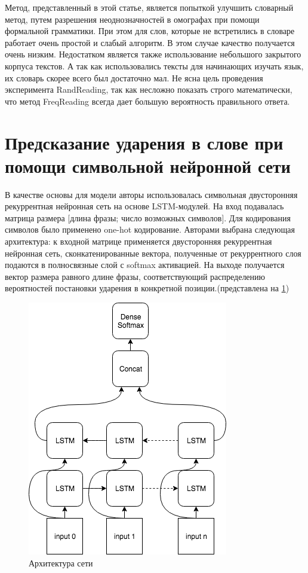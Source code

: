 \documentclass[14pt, a4paper, russian]{report}
\begin{document}
\begin{normalsize}
Метод, представленный в этой статье, является попыткой улучшить словарный метод, путем разрешения неоднозначностей в омографах при помощи формальной грамматики. При этом для слов, которые не  встретились в словаре работает очень простой и слабый алгоритм. В этом случае качество получается очень низким. Недостатком является также использование небольшого закрытого корпуса текстов. А так как использовались тексты для начинающих изучать язык, их словарь скорее всего был достаточно мал. Не ясна цель проведения эксперимента RandReading, так как несложно показать строго математически, что метод FreqReading всегда дает большую вероятность правильного ответа.

\section{Предсказание ударения в слове при помощи символьной нейронной сети}
	В качестве основы для модели авторы \cite{ponomareva} использовалась  символьная двусторонняя рекуррентная нейронная сеть на основе LSTM-модулей. На вход подавалась матрица размера [длина фразы; число возможных символов]. Для кодирования символов было применено one-hot кодирование. Авторами выбрана следующая архитектура: к входной матрице применяется двусторонняя рекуррентная нейронная сеть, сконкатенированные вектора, полученные от рекуррентного слоя подаются в полносвязные слой с softmax активацией. На выходе получается вектор размера равного длине фразы, соответствующий распределению вероятностей постановки ударения в конкретной позиции.(представлена на \cref{fig:base_global})

\begin{figure}[H]
	\begin{center}
		\includegraphics[width=0.5\linewidth]{Baseline}
	\end{center}
	\caption{\small{Архитектура сети}}
	\label{fig:base_global}
\end{figure}


\end{normalsize}
\end{document}

